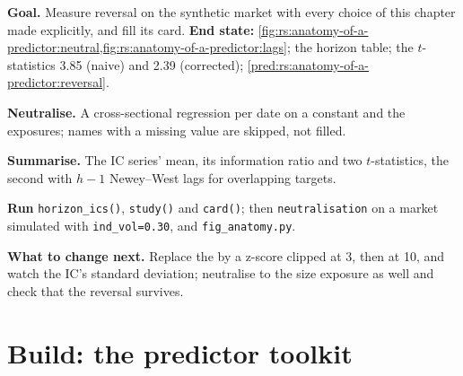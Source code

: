 \begin{tutorial}
\textbf{Goal.} Measure reversal on the synthetic market with every choice of this chapter made explicitly, and fill its card.
\textbf{End state:} \cref{fig:rs:anatomy-of-a-predictor:neutral,fig:rs:anatomy-of-a-predictor:lags}; the horizon table; the
$t$-statistics 3.85 (naive) and 2.39 (corrected); \cref{pred:rs:anatomy-of-a-predictor:reversal}.
\begin{tutsteps}
\item \textbf{Neutralise.} A cross-sectional regression per date on a constant and the exposures; names with a missing value are
skipped, not filled.
\label{lst:rs:anatomy-of-a-predictor:residual}
\item \textbf{Summarise.} The IC series' mean, its information ratio and two $t$-statistics, the second with $h - 1$ Newey--West
lags for overlapping targets.
\label{lst:rs:anatomy-of-a-predictor:summary}
\item \textbf{Run} \texttt{horizon\_ics()}, \texttt{study()} and \texttt{card()}; then \texttt{neutralisation} on a market simulated
with \texttt{ind\_vol=0.30}, and \texttt{fig\_anatomy.py}.
\end{tutsteps}
\textbf{What to change next.} Replace the  by a z-score clipped at 3, then at 10, and watch the IC's standard deviation;
neutralise to the size exposure as well and check that the reversal survives.
\end{tutorial}

\section{Build: the predictor toolkit}\label{bld:rs:anatomy-of-a-predictor:predictor}

